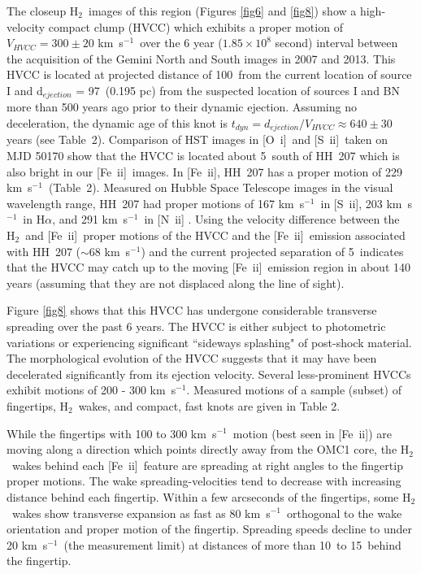 \documentclass{aa}
\newcommand{\kms}{km~s{$^{-1}$}}
\newcommand{\sii}{[S~{\sc ii]}}
\newcommand{\Feii}{[Fe~{\sc ii}]}
\newcommand{\oi}{[O~{\sc i}]}
\newcommand{\nii}{[N~{\sc ii}]}
\newcommand{\hh}{\ensuremath{\textrm{H}_{2}}}			%
\begin{document}
The closeup \hh\ images of this region (Figures \ref{fig6} and \ref{fig8}) 
show a  high-velocity compact clump (HVCC) which exhibits a proper 
motion of $V_{HVCC} = 300 \pm 20$ \kms\   over the 6 year ($1.85 \times 10^8$ second)  
interval between the acquisition of the Gemini North and South images in 2007 and 2013.   
This HVCC  is located at projected  distance of 100\arcsec\ from the current location of
source I and d$_{ejection}$ = 97\arcsec\  (0.195 pc) from  the suspected location of sources 
I and BN more than 500 years ago  prior to their dynamic ejection.   Assuming no 
deceleration, the dynamic age of this knot is  
$t_{dyn} = d_{ejection}/ V_{HVCC}  \approx  640 \pm 30$ years (see Table~2).    
Comparison of HST images in  \oi\  and \sii\  taken on MJD 50170 show that the 
HVCC is located about 5\arcsec\  south of HH~207 which is also bright in our
\Feii\ images.   In  \Feii ,    HH~207 has a proper motion  of  229 \kms\ (Table~2).   
Measured on Hubble Space Telescope images in the visual wavelength range, HH~207
had proper motions  of   167 \kms\ in \sii ,  203 \kms\ in H$\alpha$, and 291 \kms\ in \nii 
\citep{Doi2002}.     Using the velocity difference between the \hh\ and \Feii\ proper 
motions of the HVCC and the \Feii\ emission associated with HH~207 ($\sim$68 \kms )
and the current projected separation of  5\arcsec\  indicates that the HVCC may
catch up to the moving \Feii\  emission region in about 140 years (assuming that they
are not displaced along the line of sight). 

Figure \ref{fig8} shows that this HVCC  has undergone considerable transverse spreading 
over the past 6 years.    The HVCC is either  subject to photometric variations or  
experiencing significant ``sideways splashing"  of post-shock material.    
The morphological evolution of the HVCC suggests that it may have been
decelerated significantly from its ejection velocity.   
Several less-prominent HVCCs exhibit motions of 200 - 300 \kms . 
Measured motions of a sample (subset) of fingertips, \hh\  wakes, and compact, fast
knots are given  in Table 2.    

While the fingertips with 100 to 300 \kms\  motion (best seen in \Feii )  are moving 
along a direction which points directly away  from the OMC1 core,  the \hh\ wakes 
behind each \Feii\  feature are spreading at right angles to the fingertip proper motions.  
The wake spreading-velocities tend to decrease with increasing distance behind 
each  fingertip.    Within a few arcseconds of  the fingertips,  some \hh\ wakes show 
transverse expansion as fast as 80 \kms\   orthogonal to the wake orientation and proper 
motion of the fingertip.   Spreading speeds decline to under 20 \kms\  (the measurement
limit) at distances of more than 10\arcsec\ to 15\arcsec\ behind the fingertip. 
\end{document}
